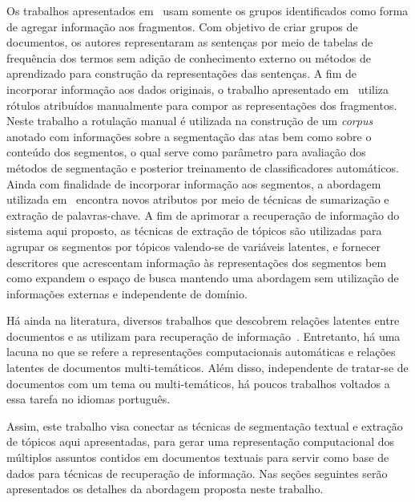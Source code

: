 Os trabalhos apresentados em~\cite{Zamir1998, Jeong:2010, Tagarelli2013} usam somente os grupos identificados como forma de agregar informação aos fragmentos. 
Com objetivo de criar grupos de documentos, os autores representaram as sentenças por meio de tabelas de frequência dos termos sem adição de conhecimento externo ou métodos de aprendizado para construção da representações das sentenças. 
A fim de incorporar informação aos dados originais, o trabalho apresentado em~\cite{Masao:2000} utiliza rótulos atribuídos manualmente para compor as representações dos fragmentos. 
Neste trabalho a rotulação manual é utilizada na construção de um \textit{corpus} anotado com informações sobre a segmentação das atas bem como sobre o conteúdo dos segmentos, o qual serve como parâmetro para avaliação dos métodos de segmentação e posterior treinamento de classificadores automáticos.  
Ainda com finalidade de incorporar informação aos segmentos, a abordagem utilizada em~\cite{Cuong2011} encontra novos atributos por meio de técnicas de sumarização e extração de palavras-chave.  
A fim de aprimorar a recuperação de informação do sistema aqui proposto, as técnicas de extração de tópicos são utilizadas para agrupar os segmentos por tópicos valendo-se de variáveis latentes, e fornecer descritores que acrescentam informação às representações dos segmentos bem como expandem o espaço de busca mantendo uma abordagem sem utilização de informações externas e independente de domínio.





Há ainda na literatura, diversos trabalhos que descobrem relações latentes entre documentos e as utilizam para recuperação de informação~\cite{Corcoglioniti2016, Jian2016, habibi2015, LiJiang2014, Rezende2011}. 
Entretanto, há uma lacuna no que se refere a representações computacionais automáticas e relações latentes de documentos multi-temáticos. Além disso, independente de tratar-se de documentos com um tema ou multi-temáticos, há poucos trabalhos voltados a essa tarefa no idiomas português.

Assim, este trabalho visa conectar as técnicas de segmentação textual e extração de tópicos aqui apresentadas, para gerar uma representação computacional dos múltiplos assuntos contidos em documentos textuais para servir como base de dados para técnicas de recuperação de informação. Nas seções seguintes serão apresentados os detalhes da abordagem proposta neste trabalho.





















